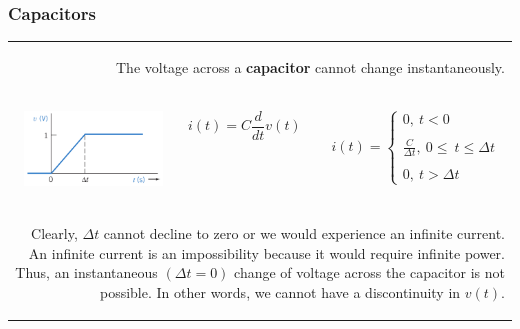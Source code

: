 \documentclass[aspectratio=169]{beamer}
\begin{document}
\begin{frame}[fragile]
\frametitle{Capacitors}
	
	\begin{tabular}{r}
	
	\begin{columns}
		\begin{column}{1\textwidth}  %
	The voltage across a \textbf{capacitor} cannot change instantaneously.
		\end{column}
	\end{columns}\\
		\begin{columns}
		\begin{column}{.25\textwidth}  %
		  \includegraphics[height=2cm]{figura5.png}     			
		\end{column}

		\begin{column}{.1\textwidth}  %
		 $$i(t)=C\frac{d}{dt}v(t)$$     			
		\end{column}
		
		
		
		\begin{column}{.3\textwidth}  %
		    $$
	    i(t)=
	    \begin{cases}
	    0, \  t<0 \\
	    \\
	    \frac{C}{\Delta t}, \ 0 \leq \ t \leq \Delta t\\
	    \\
	    0,\ t>\Delta t
	    \end{cases}
	    $$ 			

		\end{column}
		
		
	\end{columns}\\
	
		\begin{columns}
		\begin{column}{1\textwidth}  %
	\newline 
Clearly, $\Delta t$ cannot decline to zero or we would experience an infinite current. An infinite current is an
impossibility because it would require infinite power. Thus, an instantaneous $(\Delta t =0)$ change of
voltage across the capacitor is not possible. In other words, we cannot have a discontinuity in $v(t)$.
		\end{column}
	\end{columns}\\
	

\end{tabular}
\end{frame}
\end{document}
